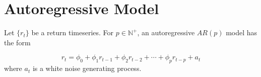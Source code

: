\documentclass{article}
\begin{document}
\section{Autoregressive Model}

Let $\{r_{t}\}$ be a return timeseries.  For $p \in \mathbb{N}^{+}$, an autoregressive $AR(p)$ model has the form

\begin{equation}
r_{t} = \phi_{0} + \phi_{1} r_{t-1} + \phi_{2} r_{t-2} + \cdots + \phi_{p} r_{t-p} + a_{t}
\end{equation}
where $a_{t}$ is a white noise generating process.
\end{document}
